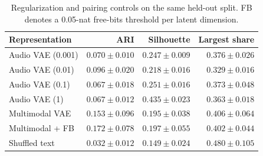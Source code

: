\begin{table}[htbp]
\centering
\caption{Regularization and pairing controls on the same held-out split. FB denotes a 0.05-nat free-bits threshold per latent dimension.}
\label{tab:ablation}
\small
\begin{tabular}{lrrr}
\toprule
Representation & ARI & Silhouette & Largest share \\
\midrule
Audio VAE (0.001) & $0.070\pm0.010$ & $0.247\pm0.009$ & $0.376\pm0.026$ \\
Audio VAE (0.01) & $0.096\pm0.020$ & $0.218\pm0.016$ & $0.329\pm0.016$ \\
Audio VAE (0.1) & $0.067\pm0.018$ & $0.251\pm0.016$ & $0.373\pm0.048$ \\
Audio VAE (1) & $0.067\pm0.012$ & $0.435\pm0.023$ & $0.363\pm0.018$ \\
Multimodal VAE & $0.153\pm0.096$ & $0.195\pm0.038$ & $0.406\pm0.064$ \\
Multimodal + FB & $0.172\pm0.078$ & $0.197\pm0.055$ & $0.402\pm0.044$ \\
Shuffled text & $0.032\pm0.012$ & $0.149\pm0.024$ & $0.480\pm0.105$ \\
\bottomrule
\end{tabular}
\end{table}
